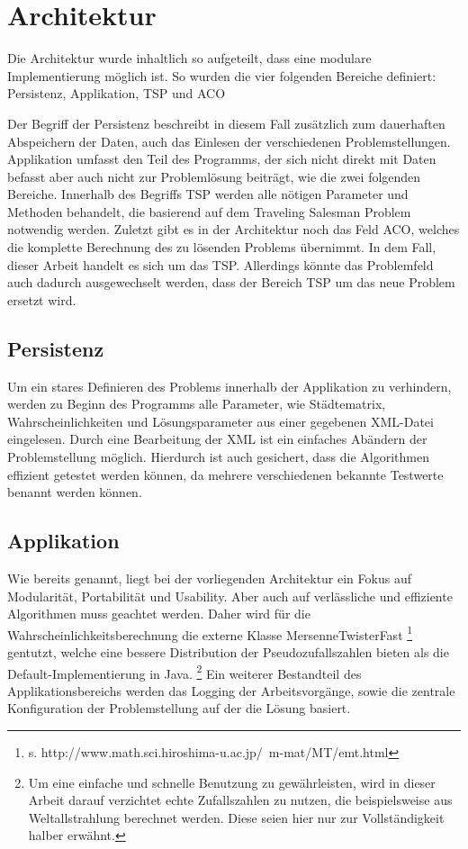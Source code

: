 \section{Architektur}{
	Die Architektur wurde inhaltlich so aufgeteilt, dass eine modulare Implementierung möglich ist. So wurden die vier folgenden Bereiche definiert: Persistenz, Applikation, TSP und ACO
	
	Der Begriff der Persistenz beschreibt in diesem Fall zusätzlich zum dauerhaften Abspeichern der Daten, auch das Einlesen der verschiedenen Problemstellungen.
	\newline
	Applikation umfasst den Teil des Programms, der sich nicht direkt mit Daten befasst aber auch nicht zur Problemlösung beiträgt, wie die zwei folgenden Bereiche.
	\newline
	Innerhalb des Begriffs TSP werden alle nötigen Parameter und Methoden behandelt, die basierend auf dem Traveling Salesman Problem notwendig werden. 
	\newline
	Zuletzt gibt es in der Architektur noch das Feld ACO, welches die komplette Berechnung des zu lösenden Problems übernimmt. In dem Fall, dieser Arbeit handelt es sich um das TSP. Allerdings könnte das Problemfeld auch dadurch ausgewechselt werden, dass der Bereich TSP um das neue Problem ersetzt wird.
	
	\subsection{Persistenz}
	Um ein stares Definieren des Problems innerhalb der Applikation zu verhindern, werden zu Beginn des Programms alle Parameter, wie Städtematrix, Wahrscheinlichkeiten und Lösungsparameter aus einer gegebenen XML-Datei eingelesen. Durch eine Bearbeitung der XML ist ein einfaches Abändern der Problemstellung möglich. Hierdurch ist auch gesichert, dass die Algorithmen effizient getestet werden können, da mehrere verschiedenen bekannte Testwerte benannt werden können.
	
	\subsection{Applikation}
	Wie bereits genannt, liegt bei der vorliegenden Architektur ein Fokus auf Modularität, Portabilität und Usability. Aber auch auf verlässliche und effiziente Algorithmen muss geachtet werden. Daher wird für die Wahrscheinlichkeitsberechnung die externe Klasse MersenneTwisterFast \footnote{s. http://www.math.sci.hiroshima-u.ac.jp/~m-mat/MT/emt.html} gentutzt, welche eine bessere Distribution der Pseudozufallszahlen bieten als die Default-Implementierung in Java.
	\footnote{Um eine einfache und schnelle Benutzung zu gewährleisten, wird in dieser Arbeit darauf verzichtet echte Zufallszahlen zu nutzen, die beispielsweise aus Weltallstrahlung berechnet werden. Diese seien hier nur zur Vollständigkeit halber erwähnt.}
	Ein weiterer Bestandteil des Applikationsbereichs werden das Logging der Arbeitsvorgänge, sowie die zentrale Konfiguration der Problemstellung auf der die Lösung basiert.
	
}
